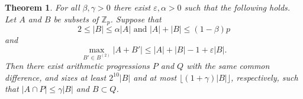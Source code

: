 \documentclass[12pt,reqno]{amsart}
\newtheorem{theorem}{Theorem}
\theoremstyle{definition}
\renewcommand\leq{\leqslant}
\begin{document}
\begin{theorem}\label{stab_2pts}
  For all $\beta, \gamma >0$ there exist $\varepsilon, \alpha>0$ such that the following holds. Let $A$ and $B$ be subsets of $\mathbb{Z}_p$. Suppose that
\begin{equation}\label{eq37.-2}
    2\leq |B| \leq \alpha |A| \text{ and } |A|+|B|\leq (1-\beta)p
\end{equation}
and
\begin{equation}\label{eq37.-1}
    \max_{B' \in B^{(2)}}|A+B'| \leq |A|+|B|-1+\varepsilon |B|.
\end{equation}
Then there exist arithmetic progressions $P$ and $Q$ with the same common difference, and sizes at least $2^{10}|B|$ and
at most $\lfloor(1+\gamma)|B|\rfloor$, respectively, such that
$|A \cap  P| \leq \gamma|B|$ and  $B \subset Q$.
\end{theorem}
\end{document}

